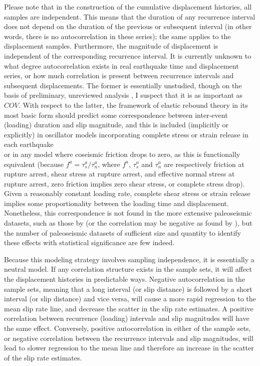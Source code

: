 \documentclass[se, manuscript]{copernicus}
\begin{document}
Please note that in the construction of the cumulative displacement
histories, all samples are independent. This means that the duration of
any recurrence interval does not depend on the duration of the previous
or subsequent interval (in other words, there is no autocorrelation in
these series); the same applies to the displacement samples.
Furthermore, the magnitude of displacement is independent of the
corresponding recurrence interval. It is currently unknown to what
degree autocorrelation exists in real earthquake time and displacement
series, or how much correlation is present between recurrence intervals
and subsequent displacements. The former is essentially unstudied,
though on the basis of preliminary, unreviewed analysis
\citep{styron_survival_2017}, I suspect that it is as important as
\(COV\). With respect to the latter, the framework of elastic rebound
theory in its most basic form should predict some correspondence between
inter-event (loading) duration and slip magnitude, and this is included
(implicitly or explicitly) in oscillator models incorporating complete
stress or strain release in each earthquake\\
\citep[e.g.]{matthews_brownian_2002,dicaprio_post-seismic_2008} or in
any model where coseismic friction drops to zero, as this is
functionally equivalent (because \(f^a = \tau^a_s / \tau^a_n\), where
\(f^a\), \(\tau^a_s\) and \(\tau^a_n\) are respectively friction at
rupture arrest, shear stress at rupture arrest, and effective normal
stress at rupture arrest, zero friction implies zero shear stress, or
complete stress drop). Given a reasonably constant loading rate,
complete shear stress or strain release implies some proportionality
between the loading time and displacement. Nonetheless, this
correspondence is not found in the more extensive paleoseismic datasets,
such as those by \citet{benedetti_earthquake_2013} (or the correlation
may be negative as found by \citet{weldon_wrightwood_2004}), but the
number of paleoseismic datasets of sufficient size and quantity to
identify these effects with statistical significance are few indeed.

Because this modeling strategy involves sampling independence, it is
essentially a neutral model. If any correlation structure exists in the
sample sets, it will affect the displacement histories in predictable
ways. Negative autocorrelation in the sample sets, meaning that a long
interval (or slip distance) is followed by a short interval (or slip
distance) and vice versa, will cause a more rapid regression to the mean
slip rate line, and decrease the scatter in the slip rate estimates. A
positive correlation between recurrence (loading) intervals and slip
magnitudes will have the same effect. Conversely, positive
autocorrelation in either of the sample sets, or negative correlation
between the recurrence intervals and slip magnitudes, will lead to
slower regression to the mean line and therefore an increase in the
scatter of the slip rate estimates.
\end{document}
